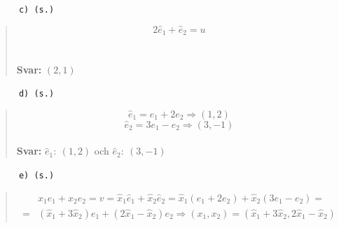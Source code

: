 \documentclass[a4paper]{article}
\newcommand{\tskcol}[1]{\textcolor{tskcol}{#1}}
\begin{document}
\texttt{\tskcol{~~~~~~c) (s.)}}
\begin{quotation}
	\noindent
	\[2\hat{e}_1+\hat{e}_2=u\]
	\\ \\
	\textbf{Svar:} $(2,1)$
\end{quotation}

\texttt{\tskcol{~~~~~~d) (s.)}}
\begin{quotation}
	\noindent
	\[\hat{e}_1=e_1+2e_2 \Rightarrow (1,2)\]
	\[\hat{e}_2=3e_1-e_2 \Rightarrow (3,-1)\]
	\\
	\textbf{Svar:} $\hat{e}_1:~(1,2)$ och $\hat{e}_2:~(3,-1)$
\end{quotation}

\pagebreak
\texttt{\tskcol{~~~~~~e) (s.)}}
\begin{quotation}
	\noindent
	\begin{align*}
	&x_1e_1+x_2e_2=v=
	\hat{x}_1\hat{e}_1+\hat{x}_2\hat{e}_2=
	\hat{x}_1(e_1+2e_2)+\hat{x}_2(3e_1-e_2)= \\ =
	&(\hat{x}_1+3\hat{x}_2)e_1+(2\hat{x}_1-\hat{x}_2)e_2 \Rightarrow (x_1,x_2)=(\hat{x}_1+3\hat{x}_2,2\hat{x}_1-\hat{x}_2)
	\end{align*}
\end{quotation}
\end{document}

